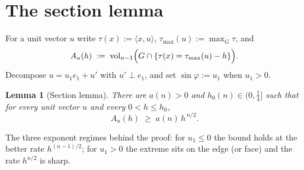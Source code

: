 \documentclass[11pt]{article}
\newtheorem{lemma}[theorem]{Lemma}
\newcommand{\vol}{\operatorname{vol}}
\begin{document}
\section{The section lemma}\label{sec:section}

For a unit vector $u$ write
$\tau(x):=\langle x,u\rangle$, $\tau_{\max}(u):=\max_G\tau$, and
\[
A_u(h)\;:=\;\vol_{n-1}\Bigl(G\cap\{\tau(x)=\tau_{\max}(u)-h\}\Bigr).
\]
Decompose $u=u_1e_1+u'$ with $u'\perp e_1$, and set
$\sin\varphi:=u_1$ when $u_1>0$.

\begin{lemma}[Section lemma]\label{lem:section}
There are $a(n)>0$ and $h_0(n)\in(0,\tfrac14]$ such that for every unit
vector $u$ and every $0<h\le h_0$,
\[
A_u(h)\;\ge\;a(n)\,h^{\,n/2}.
\]
\end{lemma}

The three exponent regimes behind the proof: for $u_1\le0$ the bound holds at
the better rate $h^{(n-1)/2}$; for $u_1>0$ the extreme sits on the edge (or
face) and the rate $h^{n/2}$ is sharp.
\end{document}
